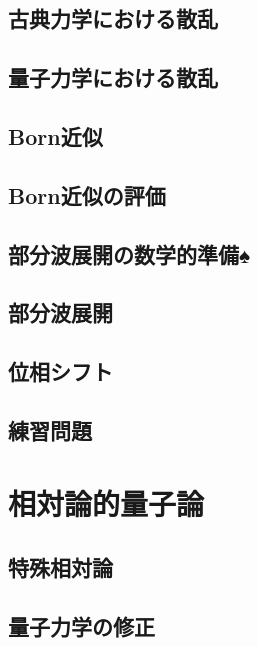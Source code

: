 \documentclass{report}
\begin{document}
    \section{古典力学における散乱}
      
    \section{量子力学における散乱}
      
    \section{Born近似}
      
    \section{Born近似の評価}
      
    \section{部分波展開の数学的準備♠}
      
    \section{部分波展開}
      
    \section{位相シフト}
      
    \section{練習問題}
      
  \chapter{相対論的量子論}
    \section{特殊相対論}
      
    \section{量子力学の修正}
      
\end{document}
